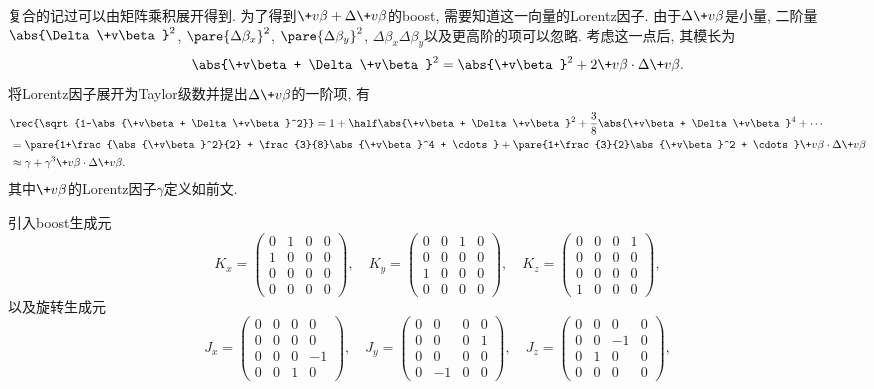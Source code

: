 \documentclass[hidelinks]{ctexart}
\begin{document}
复合的记过可以由矩阵乘积展开得到. 为了得到$\+v\beta + \Delta \+v\beta$的boost, 需要知道这一向量的Lorentz因子. 由于$\Delta \+v\beta$是小量, 二阶量$\abs{\Delta \+v\beta}^2$, $\pare{\Delta \beta_x}^2$, $\pare{\Delta\beta_y}^2$, $\Delta\beta_x \Delta \beta_y$以及更高阶的项可以忽略. 考虑这一点后, 其模长为
\[ \abs{\+v\beta + \Delta \+v\beta}^2 = \abs{\+v\beta}^2 + 2\+v\beta\cdot \Delta \+v\beta. \]
将Lorentz因子展开为Taylor级数并提出$\Delta \+v\beta$的一阶项, 有
\begin{align*}
    & \rec{\sqrt{1-\abs{\+v\beta + \Delta \+v\beta}^2}} = 1+\half \abs{\+v\beta + \Delta \+v\beta}^2 + \frac{3}{8}\abs{\+v\beta + \Delta \+v\beta}^4 + \cdots \\
    &= \pare{1+\frac{\abs{\+v\beta}^2}{2} + \frac{3}{8}\abs{\+v\beta}^4 + \cdots} + \pare{1+\frac{3}{2}\abs{\+v\beta}^2 + \cdots}\+v\beta \cdot \Delta \+v\beta \\
    &\approx \gamma + \gamma^3 \+v\beta \cdot \Delta \+v\beta.
\end{align*}
其中$\+v\beta$的Lorentz因子$\gamma$定义如前文.
\par
引入boost生成元
\[ K_x = \begin{pmatrix}
    0 & 1 & 0 & 0 \\
    1 & 0 & 0 & 0 \\
    0 & 0 & 0 & 0 \\
    0 & 0 & 0 & 0
\end{pmatrix},\quad K_y = \begin{pmatrix}
    0 & 0 & 1 & 0 \\
    0 & 0 & 0 & 0 \\
    1 & 0 & 0 & 0 \\
    0 & 0 & 0 & 0
\end{pmatrix},\quad K_z = \begin{pmatrix}
    0 & 0 & 0 & 1 \\
    0 & 0 & 0 & 0 \\
    0 & 0 & 0 & 0 \\
    1 & 0 & 0 & 0
\end{pmatrix}, \]
以及旋转生成元
\[ J_x = \begin{pmatrix}
    0 & 0 & 0 & 0 \\
    0 & 0 & 0 & 0 \\
    0 & 0 & 0 & -1 \\
    0 & 0 & 1 & 0
\end{pmatrix},\quad J_y = \begin{pmatrix}
    0 & 0 & 0 & 0 \\
    0 & 0 & 0 & 1 \\
    0 & 0 & 0 & 0 \\
    0 & -1 & 0 & 0
\end{pmatrix},\quad J_z = \begin{pmatrix}
    0 & 0 & 0 & 0 \\
    0 & 0 & -1 & 0 \\
    0 & 1 & 0 & 0 \\
    0 & 0 & 0 & 0
\end{pmatrix}, \]
\end{document}
